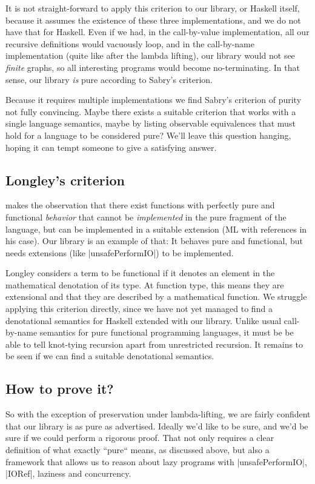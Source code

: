 \documentclass[manuscript,anonymous,screen,acmsmall]{acmart}
\begin{document}
It is not straight-forward to apply this criterion to our library, or Haskell itself, because it assumes the existence of these three implementations, and we do not have that for Haskell. Even if we had, in the call-by-value implementation, all our recursive definitions would vacuously loop, and in the call-by-name implementation (quite like after the lambda lifting), our library would not see \emph{finite} graphs, so all interesting programs would become no-terminating. In that sense, our library \emph{is} pure according to Sabry’s criterion.

Because it requires multiple implementations we find Sabry’s criterion of purity not fully convincing. Maybe there exists a suitable criterion that works with a single language semantics, maybe by listing observable equivalences that must hold for a language to be considered pure?
We'll leave this question hanging, hoping it can tempt someone to give a satisfying answer.

\subsection{Longley’s criterion}

 makes the observation that there exist functions with perfectly pure and functional \emph{behavior} that cannot be \emph{implemented} in the pure fragment of the language, but can be implemented in a suitable extension (ML with references in his case). Our library is an example of that: It behaves pure and functional, but needs extensions (like |unsafePerformIO|) to be implemented.

Longley considers a term to be functional if it denotes an element in the mathematical denotation of its type. At function type, this means they are extensional and that they are described by a mathematical function. We struggle applying this criterion directly, since we have not yet managed to find a denotational semantics for Haskell extended with our library. Unlike usual call-by-name semantics for pure functional programming languages, it must be be able to tell knot-tying recursion apart from unrestricted recursion. It remains to be seen if we can find a suitable denotational semantics.

\subsection{How to prove it?}

So with the exception of preservation under lambda-lifting, we are fairly confident that our library is as pure as advertised. Ideally we'd like to be sure, and we’d be sure if we could perform a rigorous proof.  That not only requires a clear definition of what exactly “pure“ means, as discussed above, but also a framework that allows us to reason about lazy programs with |unsafePerformIO|, |IORef|, laziness and concurrency.
\end{document}
